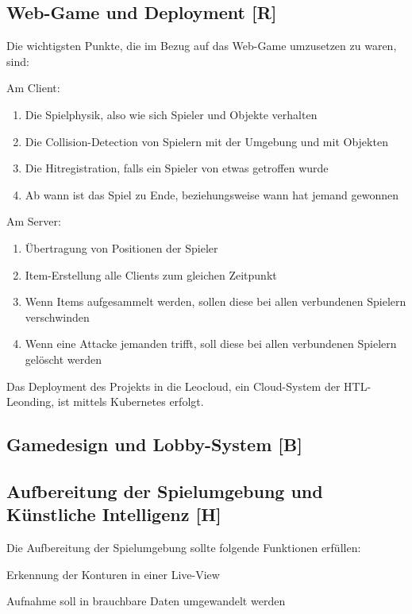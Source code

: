 \subsection{Web-Game und Deployment [R]}
Die wichtigsten Punkte, die im Bezug auf das Web-Game umzusetzen zu waren, sind:
\begin{compactitem}
    \item Am Client:
        \begin{enumerate}
            \item Die Spielphysik, also wie sich Spieler und Objekte verhalten
            \item Die Collision-Detection von Spielern mit der Umgebung und mit Objekten
            \item Die Hitregistration, falls ein Spieler von etwas getroffen wurde
            \item Ab wann ist das Spiel zu Ende, beziehungsweise wann hat jemand gewonnen 
        \end{enumerate}
    \item Am Server:
        \begin{enumerate}
            \item Übertragung von Positionen der Spieler
            \item Item-Erstellung alle Clients zum gleichen Zeitpunkt
            \item Wenn Items aufgesammelt werden, sollen diese bei allen verbundenen Spielern verschwinden
            \item Wenn eine Attacke jemanden trifft, soll diese bei allen verbundenen Spielern gelöscht werden
        \end{enumerate}

\end{compactitem} 
Das Deployment des Projekts in die Leocloud, ein Cloud-System der HTL-Leonding, ist mittels Kubernetes erfolgt.


\subsection{Gamedesign und Lobby-System [B]}

\subsection{Aufbereitung der Spielumgebung und Künstliche Intelligenz [H]}
Die Aufbereitung der Spielumgebung sollte folgende Funktionen erfüllen:
\begin{compactitem}
    \item Erkennung der Konturen in einer Live-View
    \item Aufnahme soll in brauchbare Daten umgewandelt werden
\end{compactitem}

